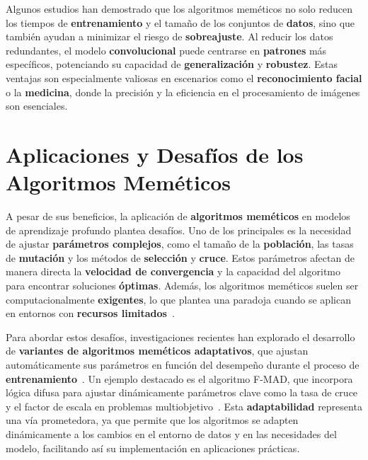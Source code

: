 Algunos estudios han demostrado que los algoritmos meméticos no solo reducen los tiempos de \textbf{entrenamiento} y el
tamaño de los conjuntos de \textbf{datos}, sino que también ayudan a minimizar el riesgo de \textbf{sobreajuste}.
Al reducir los datos redundantes, el modelo \textbf{convolucional} puede centrarse en \textbf{patrones} más
específicos, potenciando su capacidad de \textbf{generalización} y \textbf{robustez}.
Estas ventajas son especialmente valiosas en escenarios como el \textbf{reconocimiento facial} o la \textbf{medicina},
donde la precisión y la eficiencia en el procesamiento de imágenes son esenciales.


\section{Aplicaciones y Desafíos de los Algoritmos Meméticos}
\label{sec:aplicaciones-y-desafios-de-los-algoritmos-memeticos}
A pesar de sus beneficios, la aplicación de \textbf{algoritmos meméticos} en modelos de aprendizaje profundo plantea
desafíos.
Uno de los principales es la necesidad de ajustar \textbf{parámetros complejos}, como el tamaño de la
\textbf{población}, las tasas de \textbf{mutación} y los métodos de \textbf{selección} y \textbf{cruce}.
Estos parámetros afectan de manera directa la \textbf{velocidad de convergencia} y la capacidad del algoritmo para
encontrar soluciones \textbf{óptimas}.
Además, los algoritmos meméticos suelen ser computacionalmente \textbf{exigentes}, lo que plantea una paradoja cuando
se aplican en entornos con \textbf{recursos limitados}~\cite{goldbergGeneticAlgorithmsSearch1989}.


Para abordar estos desafíos, investigaciones recientes han explorado el desarrollo de
\textbf{variantes de algoritmos meméticos adaptativos}, que ajustan automáticamente sus parámetros en función del
desempeño durante el proceso de \textbf{entrenamiento}~\cite{molinaMASWChainsMemeticAlgorithm2010}.
Un ejemplo destacado es el algoritmo F-MAD, que incorpora lógica difusa para ajustar dinámicamente
parámetros clave como la tasa de cruce y el factor de escala en problemas multiobjetivo~\cite{subburajFuzzySystemBased2025}.
Esta \textbf{adaptabilidad} representa una vía prometedora, ya que permite que los algoritmos se adapten dinámicamente
a los cambios en el entorno de datos y en las necesidades del modelo, facilitando así su implementación en aplicaciones
prácticas.


